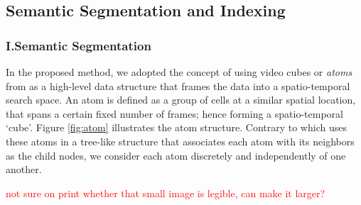 \documentclass[runningheads]{llncs}
\newcommand{\ian}[1]{\textcolor{red}{#1}}
\newcommand{\ian}[1]{}   %
\begin{document}
 \subsection{Semantic Segmentation and Indexing}
 \label{SemanticSegmentation}
 
 \subsubsection{I.\quad Semantic Segmentation}
 
In the proposed method, we adopted the concept of using video cubes or \emph{atoms} from \cite{castanon2016retrieval} as a high-level data structure that frames the data into a spatio-temporal search space.
An atom is defined as a group of cells at a similar spatial location, that spans a certain fixed number of frames; hence forming a spatio-temporal `cube'. Figure \ref{fig:atom} illustrates the atom structure. 
Contrary to \cite{castanon2016retrieval} which uses these atoms in a tree-like structure that associates each atom with its neighbors as the child nodes, we consider each atom discretely and independently of one another. 

\ian{not sure on print whether that small image is legible, can make it larger?}
\end{document}

